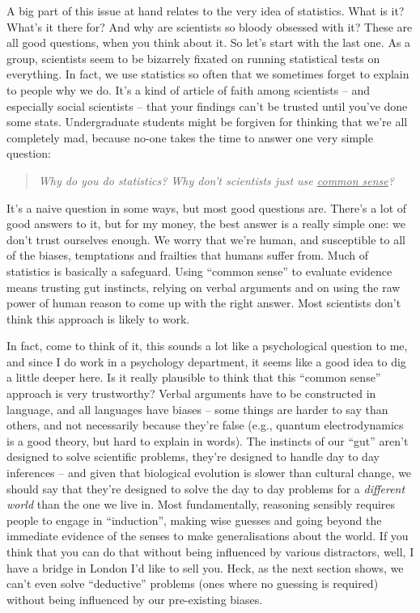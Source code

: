 A big part of this issue at hand relates to the very idea of statistics. What is it? What's it there for? And why are scientists so bloody obsessed with it? These are all good questions, when you think about it. So let's start with the last one. As a group, scientists seem to be bizarrely fixated on running statistical tests on everything. In fact, we use statistics so often that we sometimes forget to explain to people why we do. It's a kind of article of faith among scientists -- and especially social scientists -- that your findings can't be trusted until you've done some stats. Undergraduate students might be forgiven for thinking that we're all completely mad, because no-one takes the time to answer one very simple question:
\begin{quote}
{\it Why do you do statistics? Why don't scientists just use \underline{common sense}?}
\end{quote}
It's a naive question in some ways, but most good questions are. There's a lot of good answers to it, but for my money, the best answer is a really simple one: we don't trust ourselves enough. We worry that we're human, and susceptible to all of the biases, temptations and frailties that humans suffer from. Much of statistics is basically a safeguard. Using ``common sense'' to evaluate evidence means trusting gut instincts, relying on verbal arguments and on using the raw power of human reason to come up with the right answer. Most scientists don't think this approach is likely to work.

In fact, come to think of it, this sounds a lot like a psychological question to me, and since I do work in a psychology department, it seems like a good idea to dig a little deeper here. Is it really plausible to think that this ``common sense'' approach is very trustworthy? Verbal arguments have to be constructed in language, and all languages have biases -- some things are harder to say than others, and not necessarily because they're false (e.g., quantum electrodynamics is a good theory, but hard to explain in words). The instincts of our ``gut'' aren't designed to solve scientific problems, they're designed to handle day to day inferences -- and given that biological evolution is slower than cultural change, we should say that they're designed to solve the day to day problems for a {\it different world} than the one we live in. Most fundamentally, reasoning sensibly requires people to engage in ``induction'', making wise guesses and going beyond the immediate evidence of the senses to make generalisations about the world. If you think that you can do that without being influenced by various distractors, well, I have a bridge in London I'd like to sell you. Heck, as the next section shows, we can't even solve ``deductive'' problems (ones where no guessing is required) without being influenced by our pre-existing biases.

